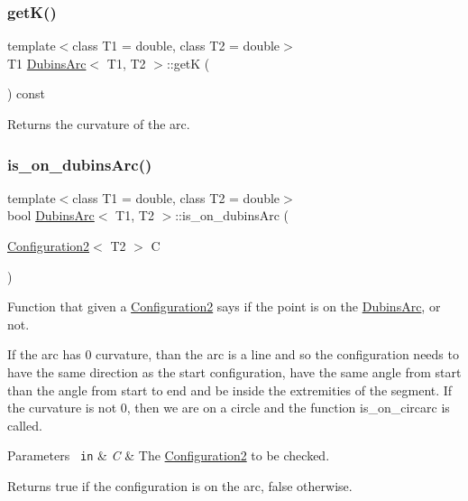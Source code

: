 \subsubsection{\texorpdfstring{getK()}{getK()}}
{\footnotesize\ttfamily template$<$class T1 = double, class T2 = double$>$ \\
T1 \mbox{\hyperlink{class_dubins_arc}{Dubins\+Arc}}$<$ T1, T2 $>$\+::getK (\begin{DoxyParamCaption}{ }\end{DoxyParamCaption}) const\hspace{0.3cm}{\ttfamily [inline]}}



Returns the curvature of the arc. 

\mbox{\label{class_dubins_arc_aa92108d7dab38e8ace212d621f9fb8dc}} 
\subsubsection{\texorpdfstring{is\_on\_dubinsArc()}{is\_on\_dubinsArc()}}
{\footnotesize\ttfamily template$<$class T1 = double, class T2 = double$>$ \\
bool \mbox{\hyperlink{class_dubins_arc}{Dubins\+Arc}}$<$ T1, T2 $>$\+::is\+\_\+on\+\_\+dubins\+Arc (\begin{DoxyParamCaption}\item[{\mbox{\hyperlink{class_configuration2}{Configuration2}}$<$ T2 $>$}]{C }\end{DoxyParamCaption})\hspace{0.3cm}{\ttfamily [inline]}}

Function that given a {\ttfamily \mbox{\hyperlink{class_configuration2}{Configuration2}}} says if the point is on the {\ttfamily \mbox{\hyperlink{class_dubins_arc}{Dubins\+Arc}}}, or not.

If the arc has 0 curvature, than the arc is a line and so the configuration needs to have the same direction as the start configuration, have the same angle from start than the angle from start to end and be inside the extremities of the segment. If the curvature is not 0, then we are on a circle and the function {\ttfamily is\+\_\+on\+\_\+circarc} is called. 
\begin{DoxyParams}[1]{Parameters}
\mbox{\texttt{ in}}  & {\em C} & The {\ttfamily \mbox{\hyperlink{class_configuration2}{Configuration2}}} to be checked. \\
\hline
\end{DoxyParams}
\begin{DoxyReturn}{Returns}
{\ttfamily true} if the configuration is on the arc, {\ttfamily false} otherwise. 
\end{DoxyReturn}
\mbox{\label{class_dubins_arc_a1b0bfacb344d17377f4bda55fdaecae4}} 

